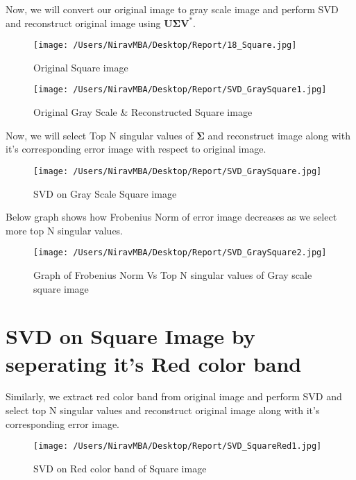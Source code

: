 \documentclass[12pt]{report}
\begin{document}
Now, we will convert our original image to gray scale image and perform SVD and reconstruct original image using  $ \mathbf{ U\Sigma V^{*} }$.

\begin{figure}[H]
	\centering
	\texttt{[image: /Users/NiravMBA/Desktop/Report/18\_Square.jpg]}
	\caption{Original Square image}
\end{figure}

\begin{figure}[H]
	\centering	
	\texttt{[image: /Users/NiravMBA/Desktop/Report/SVD\_GraySquare1.jpg]}
	\caption{Original Gray Scale \& Reconstructed Square image}
\end{figure}

Now, we will select Top N singular values of $ \mathbf{\Sigma} $ and reconstruct image along with it's corresponding error image with respect to original image.\\

\begin{figure}[H]

	\texttt{[image: /Users/NiravMBA/Desktop/Report/SVD\_GraySquare.jpg]}
	\caption{SVD on Gray Scale Square image}
\end{figure}


Below graph shows how Frobenius Norm of error image decreases as we select more top N singular values. \\
\begin{figure}[H]
	\centering
	\texttt{[image: /Users/NiravMBA/Desktop/Report/SVD\_GraySquare2.jpg]}
	\caption{Graph of Frobenius Norm Vs Top N singular values of Gray scale square image}
\end{figure}

\cleardoublepage

\section{SVD on Square Image by seperating it's Red color band}

Similarly, we extract red color band from original image and perform SVD and select top N singular values and reconstruct original image along with it's corresponding error image.\\

\begin{figure}[H]
	
	\texttt{[image: /Users/NiravMBA/Desktop/Report/SVD\_SquareRed1.jpg]}
	\caption{SVD on Red color band of Square image}
\end{figure}
\end{document}

